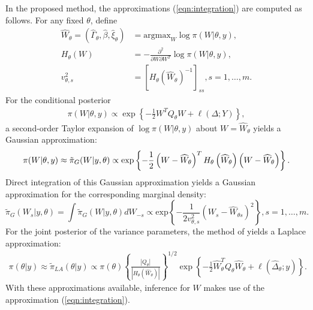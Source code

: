 \documentclass[ba]{imsart}
\begin{document}
In the proposed method, the approximations (\ref{eqn:integration}) are computed as follows. For any fixed $\theta$, define
\begin{equation}\begin{aligned}\label{eqn:modeandhessian}
\widehat{W}_{\theta} = \left(\widehat{\Gamma}_{\theta},\widehat{\beta},\widehat{\xi}_{\theta}\right) &= \text{argmax}_{W}\log\pi(W|\theta,y) , \\ 
H_{\theta}(W) &= -\frac{\partial^{2}}{\partial W \partial W^{T}}\log\pi(W|\theta,y) , \\
v_{\theta,s}^{2} &= \left[H_\theta \left(\widehat{W}_{\theta}\right) ^ {-1} \right]_{ss}, s = 1,\ldots,m .
\end{aligned}\end{equation}
For the conditional posterior
\begin{equation}\begin{aligned}\label{eqn:condpost}
\pi(W|\theta,y) \propto \exp\left\lbrace -\frac{1}{2}W^{T}Q_{\theta}W + \ell\left(\Delta;Y\right)\right\rbrace,
\end{aligned}\end{equation}
a second-order Taylor expansion of $\log\pi(W|\theta,y)$ about $W = \widehat{W}_{\theta}$ yields a Gaussian approximation:
\begin{equation}\label{eqn:gaussianapprox}
\pi(W|\theta,y) \approx \tilde{\pi}_{G}(W|y,\theta) \propto \text{exp}\left\{-\frac{1}{2} \left(W-\widehat{W}_{\theta} \right)^T H_\theta\left(\widehat{W}_{\theta}\right) \left(W-\widehat{W}_{\theta} \right) \right\}. \\
\end{equation}
Direct integration of this Gaussian approximation yields a Gaussian approximation for the corresponding marginal density:
\begin{equation}\label{eqb:marginalgaussianapprox}
\tilde{\pi}_{G}(W_{s}|y,\theta) = \int\tilde{\pi}_{G}(W|y,\theta)dW_{-s} \propto\text{exp}\left\{-\frac{1}{2v_{\theta,s}^{2}} \left(W_s-\widehat{W}_{\theta s} \right)^2 \right\}, s = 1,\ldots,m .
\end{equation}
For the joint posterior of the variance parameters, the method of \cite{tierney} yields a Laplace approximation:
\begin{equation}\begin{aligned}\label{eqn:laplace}
\pi(\theta|y) \approx \tilde{\pi}_{LA}(\theta|y) \propto \pi(\theta)\left\{\frac{\left|Q_{\theta}\right|}{\left|H_{\theta}\left(\widehat{W}_{\theta}\right)\right|}\right\}^{1/2}\exp\left\{ -\frac{1}{2}\widehat{W}_{\theta}^{T}Q_{\theta}\widehat{W}_{\theta} + \ell\left(\widehat{\Delta}_{\theta};y \right)\right\}.
\end{aligned}\end{equation}
With these approximations available, inference for $W$ makes use of the approximation (\ref{eqn:integration}).
\end{document}
